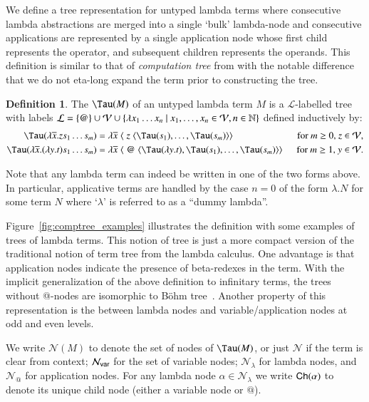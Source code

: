 \documentclass{elsarticle}
\makeatletter
\theoremstyle{plain}
\theoremstyle{definition}
\newtheorem{definition}{Definition}[section]
\newcommand\VarSet{\mathcal{V}}
\newcommand\Nodes{\mathcal{N}}%
\newcommand\NodesVar{\Nodes_{\sf var}}%
\newcommand\NodesLmd{\Nodes_\lambda}%
\newcommand\NodesApp{\Nodes_@}%
\newcommand{\child}{{\small \sf Ch}} %
\newcommand{\ctree}{\Tau} %
\makeatother
\begin{document}
We define a tree representation for untyped lambda terms where consecutive lambda abstractions are merged into a single `bulk' lambda-node and consecutive applications are represented by a single application node whose first child represents the operator, and subsequent children represents the operands.
This definition is similar to that of \emph{computation tree} from \cite{OngLics2006, BlumPhd} with the notable difference that we do not eta-long expand the term prior to constructing the tree.
\begin{definition}
The  $\ctree(M)$ of an
 untyped lambda term $M$ is a $\mathcal{L}$-labelled tree
with labels
$\mathcal{L} = \{ @ \} \union \VarSet \union \{ \lambda x_1 \ldots x_n \ | \ x_1 ,\ldots, x_n \in
    \VarSet, n\in\nat \}$
defined inductively by:
\begin{align*}
    \ctree(\lambda \overline{x} . z s_1 \ldots s_m) &= \lambda \overline{x}\; \langle\; z\; \langle \ctree(s_1),\ldots,\ctree(s_m)\rangle\rangle
&    \hbox{for $m\geq 0$, $z \in \VarSet$},
\\
\ctree(\lambda \overline{x} . (\lambda y.t) s_1 \ldots s_m) &= \lambda \overline{x}\; \langle\; @ \; \langle \ctree(\lambda y.t),\ctree(s_1),\ldots,\ctree(s_m) \rangle \rangle \enspace
&  \hbox{for $m\geq 1$, $y\in \VarSet$}.
\end{align*}

Note that any lambda term can indeed be written in one of the two forms above. In particular, applicative terms are handled by the case $n=0$ of the form $\lambda . N$ for some term $N$ where `$\lambda$' is referred to as a ``dummy lambda''.

Figure~\ref{fig:comptree_examples} illustrates the definition with some examples of trees of lambda terms.
This notion of tree is just a more compact version of the traditional notion of term tree from the lambda calculus. One advantage is that application nodes indicate the presence of beta-redexes in the term.
With the implicit generalization of the above definition to infinitary terms,
the trees without @-nodes are isomorphic to B\"ohm tree~\cite{Barendregt84}.
Another property of this representation is the  between lambda nodes and variable/application nodes at odd and even levels.

We write $\Nodes(M)$ to denote the set of nodes of $\ctree(M)$, or just $\Nodes$ if the term is clear from context; $\NodesVar$ for the set of variable nodes; $\NodesLmd$ for lambda nodes, and $\NodesApp$ for  application nodes. For any lambda node $\alpha\in\NodesLmd$ we write $\child(\alpha)$ to denote its unique child node (either a variable node or $@$).
\end{definition}
\end{document}
